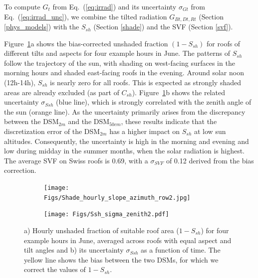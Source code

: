 
To compute $G_t$ from Eq.~(\ref{eq:irrad}) and its uncertainty $\sigma_{Gt}$ from Eq.~(\ref{eq:irrad_unc}), we combine the tilted radiation $G_{Bt,Dt,Rt}$ (Section \ref{phys_models}) with the $S_{sh}$ (Section \ref{shade}) and the SVF (Section \ref{svf}).

Figure~\ref{fig:Sh}a shows the bias-corrected unshaded fraction $(1-S_{sh})$ for roofs of different tilts and aspects for four example hours in June. 
The patterns of $S_{sh}$ follow the trajectory of the sun, with shading on west-facing surfaces in the morning hours and shaded east-facing roofs in the evening.
Around solar noon (12h-14h), $S_{sh}$ is nearly zero for all roofs. This is expected as strongly shaded areas are already excluded (as part of $C_{sh}$). 
Figure~\ref{fig:Sh}b shows the related uncertainty $\sigma_{Ssh}$ (blue line), which is strongly correlated with the zenith angle of the sun (orange line). As the uncertainty primarily arises from the discrepancy between the DSM$_{2m}$ and the DSM$_{50cm}$, these results indicate that the discretization error of the DSM$_{2m}$ has a higher impact on $S_{sh}$ at low sun altitudes.
Consequently, the uncertainty is high in the morning and evening and low during midday in the summer months, when the solar radiation is highest. 
%
The average SVF on Swiss roofs is 0.69, with a $\sigma_{SVF}$ of 0.12 derived from the bias correction.

\begin{figure}[tb]
\centering
\begin{subfigure}{.98\textwidth}
    \centering
    \texttt{[image: Figs/Shade\_hourly\_slope\_azimuth\_row2.jpg]} \subcaption{}
\end{subfigure}
\begin{subfigure}{.98\textwidth}
    \centering
    \texttt{[image: Figs/Ssh\_sigma\_zenith2.pdf]} 
    \subcaption{}
\end{subfigure}
\caption{a) Hourly unshaded fraction of suitable roof area ($1-S_{sh}$) for four example hours in June, averaged across roofs with equal aspect and tilt angles and b) its uncertainty $\sigma_{Ssh}$ as a function of time. The yellow line shows the bias between the two DSMs, for which we correct the values of $1-S_{sh}$.}
\label{fig:Sh}
\end{figure}

